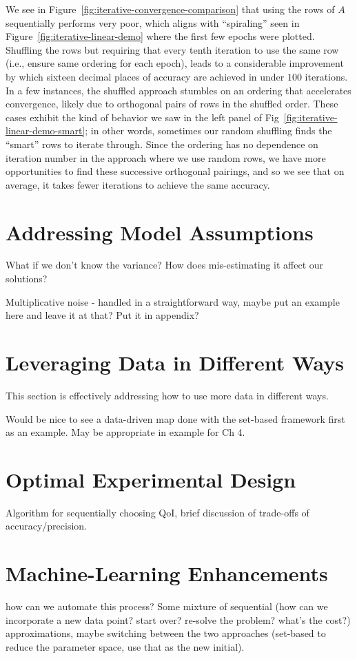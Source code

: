 We see in Figure~\ref{fig:iterative-convergence-comparison} that using the rows of $A$ sequentially performs very poor, which aligns with ``spiraling'' seen in Figure~\ref{fig:iterative-linear-demo} where the first few epochs were plotted.
Shuffling the rows but requiring that every tenth iteration to use the same row (i.e., ensure same ordering for each epoch), leads to a considerable improvement by which sixteen decimal places of accuracy are achieved in under $100$ iterations.
In a few instances, the shuffled approach stumbles on an ordering that accelerates convergence, likely due to orthogonal pairs of rows in the shuffled order.
These cases exhibit the kind of behavior we saw in the left panel of Fig~\ref{fig:iterative-linear-demo-smart}; in other words, sometimes our random shuffling finds the ``smart'' rows to iterate through.
Since the ordering has no dependence on iteration number in the approach where we use random rows, we have more opportunities to find these successive orthogonal pairings, and so we see that on average, it takes fewer iterations to achieve the same accuracy. 



\section{Addressing Model Assumptions}\label{sec:ch05-variance}

What if we don't know the variance? How does mis-estimating it affect our solutions?

Multiplicative noise - handled in a straightforward way, maybe put an example here and leave it at that? Put it in appendix?


\section{Leveraging Data in Different Ways}\label{sec:ch05-data}

This section is effectively addressing how to use more data in different ways.

Would be nice to see a data-driven map done with the set-based framework first as an example.
May be appropriate in example for Ch 4.

\section{Optimal Experimental Design}\label{sec:ch05-oed}

Algorithm for sequentially choosing QoI, brief discussion of trade-offs of accuracy/precision.

\section{Machine-Learning Enhancements}\label{sec:ch05-ml}

how can we automate this process? Some mixture of sequential (how can we incorporate a new data point? start over? re-solve the problem? what's the cost?) approximations, maybe switching between the two approaches (set-based to reduce the parameter space, use that as the new initial).
